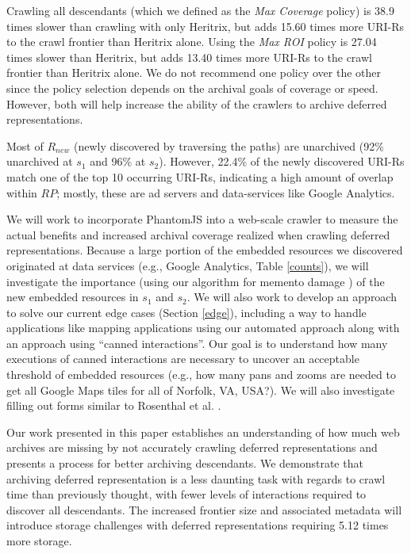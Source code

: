 \documentclass{sig-alternate}
\begin{document}
Crawling all descendants (which we defined as the \emph{Max Coverage} policy) is 38.9 times slower than crawling with only Heritrix, but adds 15.60 times more URI-Rs to the crawl frontier than Heritrix alone. Using the \emph{Max ROI} policy is 27.04 times slower than Heritrix, but adds 13.40 times more URI-Rs to the crawl frontier than Heritrix alone. 
We do not recommend one policy over the other since the policy selection depends on the archival goals of coverage or speed. However, both will help increase the ability of the crawlers to archive deferred representations. 

Most of $R_{new}$ (newly discovered by traversing the paths) are unarchived (92\% unarchived at $s_1$ and 96\% at $s_2$). However, 22.4\% of the newly discovered URI-Rs match one of the top 10 occurring URI-Rs, indicating a high amount of overlap within $RP$; mostly, these are ad servers and data-services like Google Analytics. 

We will work to incorporate PhantomJS into a web-scale crawler to measure the actual benefits and increased archival coverage realized when crawling deferred representations. Because a large portion of the embedded resources we discovered originated at data services (e.g., Google Analytics, Table \ref{counts}), we will investigate the importance (using our algorithm for memento damage \cite{brunelleDamage, damageIJDL}) of the new embedded resources in $s_1$ and $s_2$. We will also work to develop an approach to solve our current edge cases (Section \ref{edge}), including a way to handle applications like mapping applications using our automated approach along with an approach using ``canned interactions''. Our goal is to understand how many executions of canned interactions are necessary to uncover an acceptable threshold of embedded resources (e.g., how many pans and zooms are needed to get all Google Maps tiles for all of Norfolk, VA, USA?). We will also investigate filling out forms similar to Rosenthal et al. \cite{dshrDlib}.

Our work presented in this paper establishes an understanding of how much web archives are missing by not accurately crawling deferred representations and presents a process for better archiving descendants. We demonstrate that archiving deferred representation is a less daunting task with regards to crawl time than previously thought, with fewer levels of interactions required to discover all descendants. The increased frontier size and associated metadata will introduce storage challenges with deferred representations requiring 5.12 times more storage.
\end{document}
